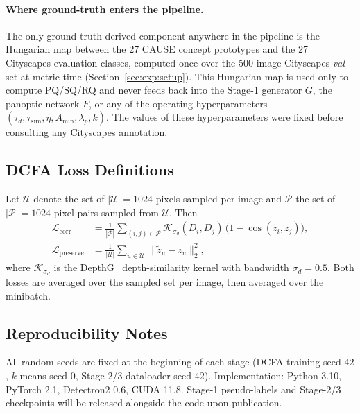 \documentclass{article}
\begin{document}
\paragraph{Where ground-truth enters the pipeline.}
The only ground-truth-derived component anywhere in the pipeline is the Hungarian map between the 27 CAUSE concept prototypes and the 27 Cityscapes evaluation classes, computed once over the 500-image Cityscapes \emph{val} set at metric time (Section~\ref{sec:exp:setup}). This Hungarian map is used only to compute PQ/SQ/RQ and never feeds back into the Stage-1 generator $G$, the panoptic network $F$, or any of the operating hyperparameters $(\tau_d, \tau_\text{sim}, \eta, A_\text{min}, \lambda_p, k)$. The values of these hyperparameters were fixed before consulting any Cityscapes annotation.

\subsection{DCFA Loss Definitions}
\label{sec:supp:impl:dcfa_loss}

Let $\mathcal{U}$ denote the set of $|\mathcal{U}| = 1024$ pixels sampled per image and $\mathcal{P}$ the set of $|\mathcal{P}| = 1024$ pixel pairs sampled from $\mathcal{U}$. Then
\begin{align*}
\mathcal{L}_\text{corr} &= \tfrac{1}{|\mathcal{P}|}\!\!\sum_{(i,j)\in\mathcal{P}} \mathcal{K}_{\sigma_d}(D_i, D_j)\,\big(1 - \cos(\tilde z_i, \tilde z_j)\big), \\
\mathcal{L}_\text{preserve} &= \tfrac{1}{|\mathcal{U}|} \sum_{u \in \mathcal{U}} \|\tilde z_u - z_u\|_2^2,
\end{align*}
where $\mathcal{K}_{\sigma_d}$ is the DepthG~\cite{sick2024depthg} depth-similarity kernel with bandwidth $\sigma_d=0.5$. Both losses are averaged over the sampled set per image, then averaged over the minibatch.

\subsection{Reproducibility Notes}
\label{sec:supp:impl:repro}

All random seeds are fixed at the beginning of each stage (DCFA training seed $42$, $k$-means seed $0$, Stage-2/3 dataloader seed $42$). Implementation: Python 3.10, PyTorch 2.1, Detectron2 0.6, CUDA 11.8. Stage-1 pseudo-labels and Stage-2/3 checkpoints will be released alongside the code upon publication.

\end{document}

